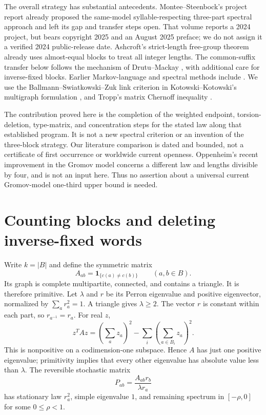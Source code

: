 \documentclass[11pt,letterpaper]{article}
\newcommand{\one}{\mathbf 1}
\begin{document}
The overall strategy has substantial antecedents. Montee--Steenbock's project report \cite[pp.~77--79, especially p.~78]{esi} already proposed the same-model syllable-respecting three-part spectral approach and left its gap and transfer steps open. That volume reports a 2024 project, but bears copyright 2025 and an August 2025 preface; we do not assign it a verified 2024 public-release date. Ashcroft's strict-length free-group theorem \cite[Theorem B, Definition 3.6, \S6]{ashcroft} already uses almost-equal blocks to treat all integer lengths. The common-suffix transfer below follows the mechanism of Drutu--Mackay \cite[Lemma 12.2]{dm}, with additional care for inverse-fixed blocks. Earlier Markov-language and spectral methods include \cite{bnw,ashcroftmarkov}. We use the Ballmann--Swiatkowski--Zuk link criterion in Kotowski--Kotowski's multigraph formulation \cite[Theorem 2.13]{kk}, and Tropp's matrix Chernoff inequality \cite[Corollary 5.2 and Remark 5.3]{tropp}.

The contribution proved here is the completion of the weighted endpoint, torsion-deletion, type-matrix, and concentration steps for the stated law along that established program. It is not a new spectral criterion or an invention of the three-block strategy. Our literature comparison is dated and bounded, not a certificate of first occurrence or worldwide current openness. Oppenheim's recent improvement in the Gromov model \cite{oppenheim} concerns a different law and lengths divisible by four, and is not an input here. Thus no assertion about a universal current Gromov-model one-third upper bound is needed.

\section{Counting blocks and deleting inverse-fixed words}
Write $k=|B|$ and define the symmetric matrix
\[
 A_{ab}=\one_{\{c(a)\ne c(b)\}}\qquad(a,b\in B).
\]
Its graph is complete multipartite, connected, and contains a triangle. It is therefore primitive. Let $\lambda$ and $r$ be its Perron eigenvalue and positive eigenvector, normalized by $\sum_a r_a^2=1$. A triangle gives $\lambda\geq2$. The vector $r$ is constant within each part, so $r_{a^{-1}}=r_a$. For real $z$,
\[
 z^T A z=\left(\sum_a z_a\right)^2-
       \sum_i\left(\sum_{a\in B_i}z_a\right)^2.
\]
This is nonpositive on a codimension-one subspace. Hence $A$ has just one positive eigenvalue; primitivity implies that every other eigenvalue has absolute value less than $\lambda$. The reversible stochastic matrix
\begin{equation}\label{eq:P}
 P_{ab}=\frac{A_{ab}r_b}{\lambda r_a}
\end{equation}
has stationary law $r_a^2$, simple eigenvalue $1$, and remaining spectrum in $[-\rho,0]$ for some $0\leq\rho<1$.
\end{document}
